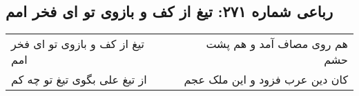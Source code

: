 \begin{center}
\section*{رباعی شماره ۲۷۱: تیغ از کف و بازوی تو ای فخر امم}
\label{sec:sh271}
\begin{longtable}{l p{0.5cm} r}
تیغ از کف و بازوی تو ای فخر امم
&&
هم روی مصاف آمد و هم پشت حشم
\\
از تیغ علی بگوی تیغ تو چه کم
&&
کان دین عرب فزود و این ملک عجم
\\
\end{longtable}
\end{center}

